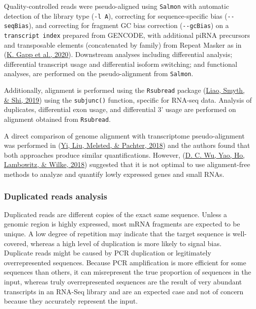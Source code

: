 \documentclass[12pt,twoside]{reedthesis}
\begin{document}
Quality-controlled reads were pseudo-aligned using \texttt{Salmon} with
automatic detection of the library type (\texttt{-l\ A}), correcting for
sequence-specific bias (\texttt{-\/-seqBias}), and correcting for fragment GC
bias correction (\texttt{-\/-gcBias}) on a \texttt{transcript\ index} prepared from
GENCODE, with additional piRNA precursors and transposable elements
(concatenated by family) from Repeat Masker as in (\protect\hyperlink{ref-gapp2020}{K. Gapp et al., 2020}).
Downstream analyses including differential analysis; differential
transcript usage and differential isoform switching; and functional
analyses, are performed on the pseudo-alignment from \texttt{Salmon}.

Additionally, alignment is performed using the \texttt{Rsubread} package
(\protect\hyperlink{ref-liao2019}{Liao, Smyth, \& Shi, 2019}) using the \texttt{subjunc()} function, specific for RNA-seq data.
Analysis of duplicates, differential exon usage, and differential 3'
usage are performed on alignment obtained from \texttt{Rsubread}.

A direct comparison of genome alignment with transcriptome
pseudo-alignment was performed in (\protect\hyperlink{ref-yi2018}{Yi, Liu, Melsted, \& Pachter, 2018}) and the authors found that
both approaches produce similar quantifications. However, (\protect\hyperlink{ref-wu2018}{D. C. Wu, Yao, Ho, Lambowitz, \& Wilke, 2018})
suggested that it is not optimal to use alignment-free methods to
analyze and quantify lowly expressed genes and small RNAs.

\hypertarget{m3.2.2}{%
\subsubsection*{Duplicated reads analysis}\label{m3.2.2}}

Duplicated reads are different copies of the exact same sequence. Unless
a genomic region is highly expressed, most mRNA fragments are expected
to be unique. A low degree of repetition may indicate that the target
sequence is well-covered, whereas a high level of duplication is more
likely to signal bias. Duplicate reads might be caused by PCR
duplication or legitimately overrepresented sequences. Because PCR
amplification is more efficient for some sequences than others, it can
misrepresent the true proportion of sequences in the input, whereas
truly overrepresented sequences are the result of very abundant
transcripts in an RNA-Seq library and are an expected case and not of
concern because they accurately represent the input.
\end{document}
